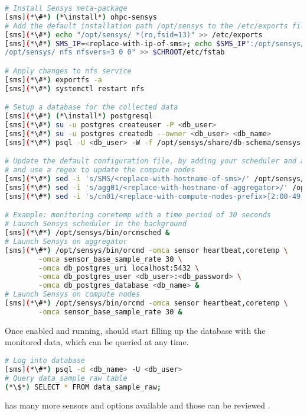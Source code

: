 \begin{lstlisting}[language=bash,keywords={},upquote=true]
# Install Sensys meta-package
[sms](*\#*) (*\install*) ohpc-sensys
# Add the default installation path /opt/sensys to the /etc/exports file
[sms](*\#*) echo "/opt/sensys/ *(ro,fsid=13)" >> /etc/exports
[sms](*\#*) SMS_IP=<replace-with-ip-of-sms>; echo $SMS_IP":/opt/sensys/
/opt/sensys/ nfs nfsvers=3 0 0" >> $CHROOT/etc/fstab

# Apply changes to nfs service
[sms](*\#*) exportfs -a
[sms](*\#*) systemctl restart nfs

# Setup a database for the collected data
[sms](*\#*) (*\install*) postgresql
[sms](*\#*) su -u postgres createuser -P <db_user>
[sms](*\#*) su -u postgres createdb --owner <db_user> <db_name>
[sms](*\#*) psql -U <db_user> -W -f /opt/sensys/share/db-schema/sensys.sql <db_name>

# Update the default configuration file, by adding your scheduler and aggregator hostnames
# and use a regex to update the compute nodes
[sms](*\#*) sed -i 's/SMS/<replace-with-hostname-of-sms>/' /opt/sensys/etc/orcm-site.xml
[sms](*\#*) sed -i 's/agg01/<replace-with-hostname-of-aggregator>/' /opt/sensys/etc/orcm-site.xml
[sms](*\#*) sed -i 's/cn01/<replace-with-compute-nodes-prefix>[2:00-49]/' /opt/sensys/etc/orcm-site.xml

# Example: monitoring coretemp with a time period of 30 seconds
# Launch Sensys scheduler in the background
[sms](*\#*) /opt/sensys/bin/orcmsched &
# Launch Sensys on aggregator
[sms](*\#*) /opt/sensys/bin/orcmd -omca sensor heartbeat,coretemp \
        -omca sensor_base_sample_rate 30 \
        -omca db_postgres_uri localhost:5432 \
        -omca db_postgres_user <db_user>:<db_password> \
        -omca db_postgres_database <db_name> &
# Launch Sensys on compute nodes
[sms](*\#*) /opt/sensys/bin/orcmd -omca sensor heartbeat,coretemp \
        -omca sensor_base_sample_rate 30 &
\end{lstlisting}

\noindent  Once enabled and running, \Sensys{} should start filling up the
database with the monitored data, which can be queried at any time.

\begin{lstlisting}[language=bash,keywords={},upquote=true]
# Log into database
[sms](*\#*) psql -d <db_name> -U <db_user>
# Query data_sample_raw table
(*\$*) SELECT * FROM data_sample_raw;
\end{lstlisting}

\noindent \Sensys{} has many more sensors and options available and those can be
reviewed \href{https://intel-ctrlsys.github.io/sensys}{\color{blue}{here}}.

